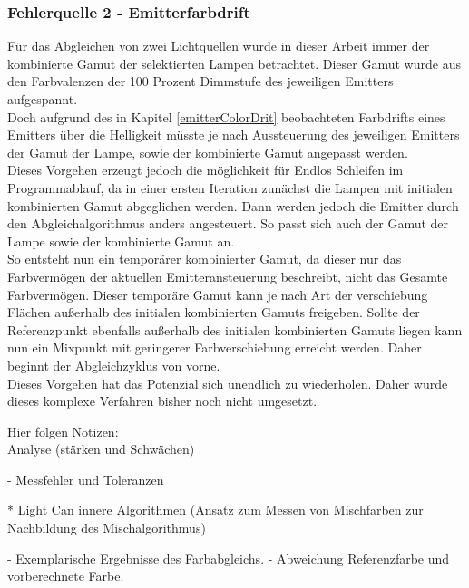 \documentclass[11pt]{scrartcl}
\begin{document}
\subsubsection{Fehlerquelle 2 - Emitterfarbdrift}
Für das Abgleichen von zwei Lichtquellen wurde in dieser Arbeit immer der kombinierte Gamut der selektierten Lampen
betrachtet. Dieser Gamut wurde aus den Farbvalenzen der 100 Prozent Dimmstufe des jeweiligen Emitters aufgespannt.\\
Doch aufgrund des in Kapitel \ref{emitterColorDrit} beobachteten Farbdrifts eines Emitters über die Helligkeit müsste
je nach Aussteuerung des jeweiligen Emitters der Gamut der Lampe, sowie der kombinierte Gamut angepasst werden.\\
Dieses Vorgehen erzeugt jedoch die möglichkeit für Endlos Schleifen im Programmablauf, da in einer ersten Iteration
zunächst die Lampen mit initialen kombinierten Gamut abgeglichen werden. Dann werden jedoch die Emitter durch den
Abgleichalgorithmus anders angesteuert. So passt sich auch der Gamut der Lampe sowie der kombinierte Gamut an.\\
So entsteht nun ein temporärer kombinierter Gamut, da dieser nur das Farbvermögen der aktuellen Emitteransteuerung
beschreibt, nicht das Gesamte Farbvermögen. Dieser temporäre Gamut kann je nach Art der verschiebung Flächen
außerhalb des initialen kombinierten Gamuts freigeben. Sollte der Referenzpunkt ebenfalls außerhalb des initialen
kombinierten Gamuts liegen kann nun ein Mixpunkt mit geringerer Farbverschiebung erreicht werden. Daher beginnt
der Abgleichzyklus von vorne.\\
Dieses Vorgehen hat das Potenzial sich unendlich zu wiederholen. Daher wurde dieses komplexe Verfahren bisher noch
nicht umgesetzt.\\
{\color{red}
Hier folgen Notizen:\\
Analyse (stärken und Schwächen)
\begin{addmargin}[2em]{0em}
    - Messfehler und Toleranzen
\end{addmargin}
\begin{addmargin}[4em]{0em}
    * Light Can innere Algorithmen (Ansatz zum Messen von Mischfarben zur Nachbildung des Mischalgorithmus)
\end{addmargin}
\begin{addmargin}[2em]{0em}
    - Exemplarische Ergebnisse des Farbabgleichs.
    - Abweichung Referenzfarbe und vorberechnete Farbe.
\end{addmargin}}
\clearpage
\end{document}
